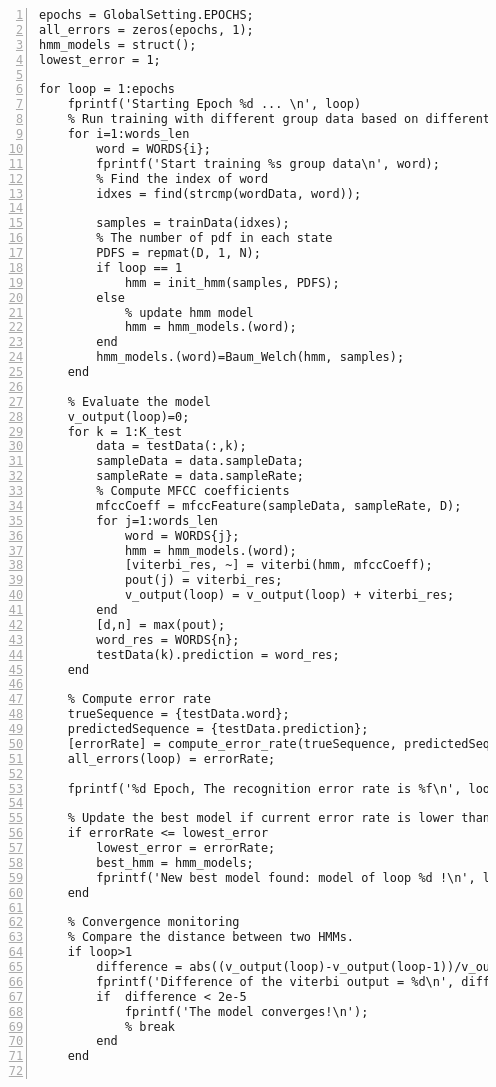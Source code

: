 \documentclass{article}
\begin{document}
\begin{lstlisting}[frame=single, numbers=left, style=Matlab-editor, caption={train\_model.m}, label={lst:train_model}]
% Train HMM model
epochs = GlobalSetting.EPOCHS;
all_errors = zeros(epochs, 1);
hmm_models = struct();
lowest_error = 1;

for loop = 1:epochs
    fprintf('Starting Epoch %d ... \n', loop)
    % Run training with different group data based on different word.
    for i=1:words_len
        word = WORDS{i};
        fprintf('Start training %s group data\n', word);
        % Find the index of word
        idxes = find(strcmp(wordData, word));

        samples = trainData(idxes);
        % The number of pdf in each state
        PDFS = repmat(D, 1, N);
        if loop == 1
            hmm = init_hmm(samples, PDFS);
        else
            % update hmm model
            hmm = hmm_models.(word);
        end
        hmm_models.(word)=Baum_Welch(hmm, samples);
    end

    % Evaluate the model
    v_output(loop)=0;
    for k = 1:K_test
        data = testData(:,k);
        sampleData = data.sampleData;
        sampleRate = data.sampleRate;
        % Compute MFCC coefficients
        mfccCoeff = mfccFeature(sampleData, sampleRate, D);
        for j=1:words_len
            word = WORDS{j};
            hmm = hmm_models.(word);
            [viterbi_res, ~] = viterbi(hmm, mfccCoeff);
            pout(j) = viterbi_res;
            v_output(loop) = v_output(loop) + viterbi_res;
        end
        [d,n] = max(pout);
        word_res = WORDS{n};
        testData(k).prediction = word_res;
    end

    % Compute error rate
    trueSequence = {testData.word};
    predictedSequence = {testData.prediction};
    [errorRate] = compute_error_rate(trueSequence, predictedSequence);
    all_errors(loop) = errorRate;

    fprintf('%d Epoch, The recognition error rate is %f\n', loop, errorRate)

    % Update the best model if current error rate is lower than the best one
    if errorRate <= lowest_error
        lowest_error = errorRate;
        best_hmm = hmm_models;
        fprintf('New best model found: model of loop %d !\n', loop);
    end

    % Convergence monitoring
    % Compare the distance between two HMMs.
    if loop>1
        difference = abs((v_output(loop)-v_output(loop-1))/v_output(loop));
        fprintf('Difference of the viterbi output = %d\n', difference);
        if  difference < 2e-5
            fprintf('The model converges!\n');
            % break
        end
    end


\end{lstlisting}
\end{document}
